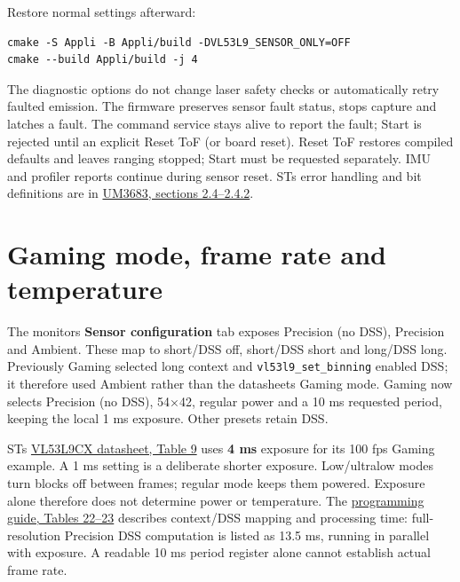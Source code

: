 \documentclass[10pt,a4paper,oneside]{report}
\begin{document}
Restore normal settings afterward:

\begin{verbatim}
cmake -S Appli -B Appli/build -DVL53L9_SENSOR_ONLY=OFF
cmake --build Appli/build -j 4
\end{verbatim}

The diagnostic options do not change laser safety checks or automatically retry faulted emission. The firmware preserves sensor fault status, stops capture and latches a fault. The command service stays alive to report the fault; Start is rejected until an explicit Reset ToF (or board reset). Reset ToF restores compiled defaults and leaves ranging stopped; Start must be requested separately. IMU and profiler reports continue during sensor reset. ST\textquotesingle s error handling and bit definitions are in \href{https://www.st.com/resource/en/user_manual/um3683-programing-guide-stmicroelectronics.pdf\#page=16}{UM3683, sections 2.4--2.4.2}.

\section{Gaming mode, frame rate and temperature}\label{wiki-tools-streaming-and-diagnostics--gaming-mode-frame-rate-and-temperature}

The monitor\textquotesingle s \textbf{Sensor configuration} tab exposes Precision (no DSS), Precision and Ambient. These map to short/DSS off, short/DSS short and long/DSS long. Previously Gaming selected long context and \texttt{vl53l9\_\allowbreak{}set\_\allowbreak{}binning} enabled DSS; it therefore used Ambient rather than the datasheet\textquotesingle s Gaming mode. Gaming now selects Precision (no DSS), 54×42, regular power and a 10 ms requested period, keeping the local 1 ms exposure. Other presets retain DSS.

ST\textquotesingle s \href{https://www.st.com/resource/en/datasheet/vl53l9cx.pdf}{VL53L9CX datasheet, Table 9} uses \textbf{4 ms} exposure for its 100 fps Gaming example. A 1 ms setting is a deliberate shorter exposure. Low/ultralow modes turn blocks off between frames; regular mode keeps them powered. Exposure alone therefore does not determine power or temperature. The \href{https://www.st.com/resource/en/user_manual/um3683-programing-guide-stmicroelectronics.pdf}{programming guide, Tables 22--23} describes context/DSS mapping and processing time: full-resolution Precision DSS computation is listed as 13.5 ms, running in parallel with exposure. A readable 10 ms period register alone cannot establish actual frame rate.
\end{document}
